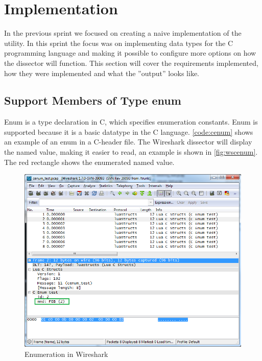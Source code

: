 \section{Implementation}

In the previous sprint we focused on creating a naive implementation of the 
utility. In this sprint the focus was on implementing data types for the 
C programming language and making it possible to configure more options on how 
the dissector will function. This section will cover the requirements 
implemented, how they were implemented and what the ''output'' looks like.

\subsection{Support Members of Type enum}
\label{sec:supportenum}
Enum is a type declaration in C, which specifies enumeration constants.  Enum 
is supported because it is a basic datatype in the C language. 
\autoref{code:cenum} shows an example of an enum in a C-header file. The 
Wireshark dissector will display the named value, making it 
easier to read, an example is shown in \autoref{fig:wscenum}. The red 
rectangle shows the enumerated named value.

\begin{figure}[ht]
	\center
	\includegraphics[width=\textwidth]{./sprints/img/wireshark_cenum}
	\caption{Enumeration in Wireshark\label{fig:wscenum}}
\end{figure}

